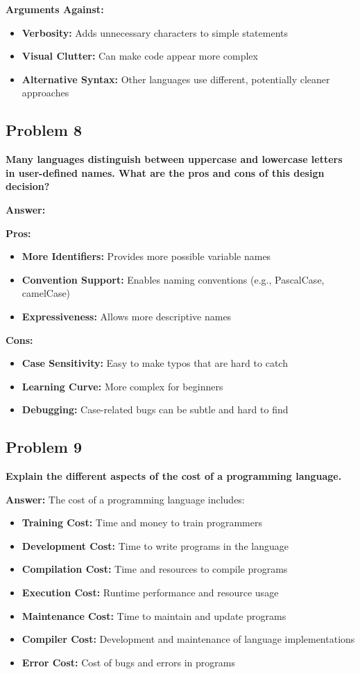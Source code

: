 \documentclass[11pt,a4paper]{article}
\begin{document}
\textbf{Arguments Against:}
\begin{itemize}
\item \textbf{Verbosity:} Adds unnecessary characters to simple statements
\item \textbf{Visual Clutter:} Can make code appear more complex
\item \textbf{Alternative Syntax:} Other languages use different, potentially cleaner approaches
\end{itemize}

\subsection{Problem 8}
\textbf{Many languages distinguish between uppercase and lowercase letters in user-defined names. What are the pros and cons of this design decision?}

\textbf{Answer:}

\textbf{Pros:}
\begin{itemize}
\item \textbf{More Identifiers:} Provides more possible variable names
\item \textbf{Convention Support:} Enables naming conventions (e.g., PascalCase, camelCase)
\item \textbf{Expressiveness:} Allows more descriptive names
\end{itemize}

\textbf{Cons:}
\begin{itemize}
\item \textbf{Case Sensitivity:} Easy to make typos that are hard to catch
\item \textbf{Learning Curve:} More complex for beginners
\item \textbf{Debugging:} Case-related bugs can be subtle and hard to find
\end{itemize}

\subsection{Problem 9}
\textbf{Explain the different aspects of the cost of a programming language.}

\textbf{Answer:}
The cost of a programming language includes:

\begin{itemize}
\item \textbf{Training Cost:} Time and money to train programmers
\item \textbf{Development Cost:} Time to write programs in the language
\item \textbf{Compilation Cost:} Time and resources to compile programs
\item \textbf{Execution Cost:} Runtime performance and resource usage
\item \textbf{Maintenance Cost:} Time to maintain and update programs
\item \textbf{Compiler Cost:} Development and maintenance of language implementations
\item \textbf{Error Cost:} Cost of bugs and errors in programs
\end{itemize}
\end{document}
